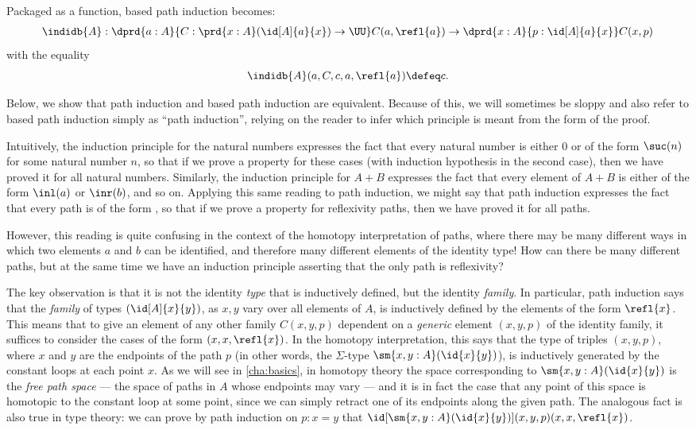 Packaged as a function, based path induction becomes:
%
\begin{align*}
  \indidb{A} :  \dprd{a:A}{C : \prd{x:A} (\id[A]{a}{x}) \to \UU}
  C(a,\refl{a}) \to \dprd{x:A}{p : \id[A]{a}{x}} C(x,p) 
\end{align*}
with the equality
\[ \indidb{A}(a,C,c,a,\refl{a}) \defeq c. \]

Below, we show that path induction and based path induction are equivalent.  Because of this, we will sometimes be sloppy and also refer to based path induction simply as ``path induction'', relying on the reader to infer which principle is meant from the form of the proof.

\begin{rmk}\label{rmk:the-only-path-is-refl}
  Intuitively, the induction principle for the natural numbers expresses the fact that every natural number is either $0$ or of the form $\suc(n)$ for some natural number $n$, so that if we prove a property for these cases (with induction hypothesis in the second case), then we have proved it for all natural numbers.
  Similarly, the induction principle for $A+B$ expresses the fact that every element of $A+B$ is either of the form $\inl(a)$ or $\inr(b)$, and so on.
  Applying this same reading to path induction, we might say that path induction expresses the fact that every path is of the form , so that if we prove a property for reflexivity paths, then we have proved it for all paths.

  However, this reading is quite confusing in the context of the homotopy interpretation of paths, where there may be many different ways in which two elements $a$ and $b$ can be identified, and therefore many different elements of the identity type!
  How can there be many different paths, but at the same time we have an induction principle asserting that the only path is reflexivity?

The key observation is that it is not the identity \emph{type} that is inductively defined, but the identity \emph{family}.
In particular, path induction says that the \emph{family} of types $(\id[A]{x}{y})$, as $x,y$ vary over all elements of $A$, is inductively defined by the elements of the form $\refl{x}$.
This means that to give an element of any other family $C(x,y,p)$ dependent on a \emph{generic} element $(x,y,p)$ of the identity family, it suffices to consider the cases of the form $(x,x,\refl{x})$.
In the homotopy interpretation, this says that the type of triples $(x,y,p)$, where $x$ and $y$ are the endpoints of the path $p$ (in other words, the $\Sigma$-type $\sm{x,y:A}(\id{x}{y})$), is inductively generated by the constant loops at each point $x$.
As we will see in \cref{cha:basics}, in homotopy theory the space corresponding to $\sm{x,y:A}(\id{x}{y})$ is the \emph{free path space} --- the space of paths in $A$ whose endpoints may vary --- and it is in fact the case that any point of this space is homotopic to the constant loop at some point, since we can simply retract one of its endpoints along the given path.
The analogous fact is also true in type theory: we can prove by path induction on $p:x=y$ that $\id[\sm{x,y:A}(\id{x}{y})]{(x,y,p)}{(x,x,\refl{x})}$.


\end{rmk}
